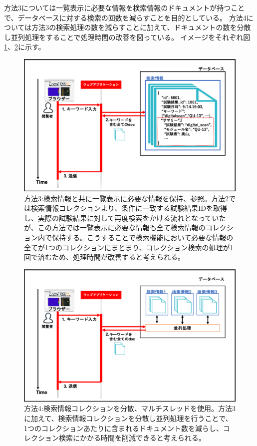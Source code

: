 方法3については一覧表示に必要な情報を検索情報のドキュメントが持つことで、データベースに対する検索の回数を減らすことを目的としている。
方法4については方法3の検索処理の数を減らすことに加えて、ドキュメントの数を分散し並列処理をすることで処理時間の改善を図っている。
イメージをそれぞれ図\ref{search_summary_hash}、\ref{search_multi_thread}に示す。

\begin{figure}[bpt]
  \begin{center}
    \includegraphics[width=12cm]{./search_summary_hash.png}
  \caption[方法3:検索情報と共に一覧表示に必要な情報を保持、参照]{方法3:検索情報と共に一覧表示に必要な情報を保持、参照。方法2では検索情報コレクションより、条件に一致する試験結果IDを取得し、実際の試験結果に対して再度検索をかける流れとなっていたが、この方法では一覧表示に必要な情報も全て検索情報のコレクション内で保持する。こうすることで検索機能において必要な情報の全てが1つのコレクションにまとまり、コレクション検索の処理が1回で済むため、処理時間が改善すると考えられる。}
  \label{search_summary_hash}
  \end{center}
\end{figure}

\begin{figure}[bpt]
  \begin{center}
    \includegraphics[width=12cm]{./search_multi_thread.png}
  \caption[方法4:検索情報コレクションを分散、マルチスレッドを使用]{方法4:検索情報コレクションを分散、マルチスレッドを使用。方法3に加えて、検索情報コレクションを分散し並列処理を行うことで、1つのコレクションあたりに含まれるドキュメント数を減らし、コレクション検索にかかる時間を削減できると考えられる。}
  \label{search_multi_thread}
  \end{center}
\end{figure}


